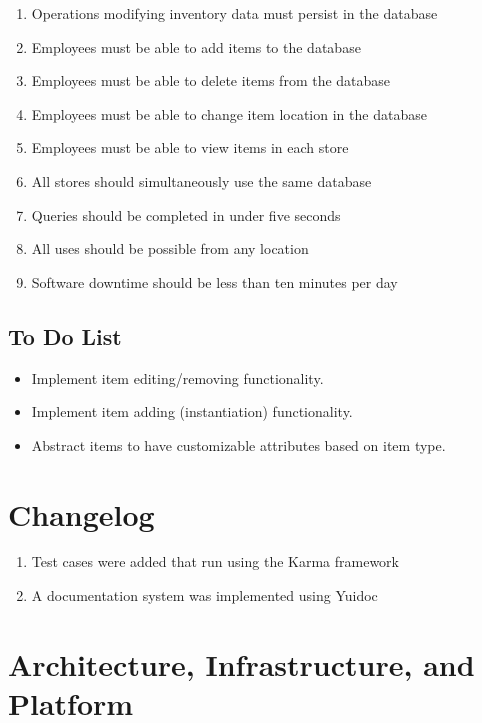 \documentclass[letterpaper, 12pt]{article}
\begin{document}
\begin{enumerate}
\item Operations modifying inventory data must persist in the database
\item Employees must be able to add items to the database
\item Employees must be able to delete items from the database
\item Employees must be able to change item location in the database
\item Employees must be able to view items in each store
\item All stores should simultaneously use the same database
\item Queries should be completed in under five seconds
\item All uses should be possible from any location
\item Software downtime should be less than ten minutes per day
\end{enumerate}

\subsection{To Do List}
\begin{itemize}
\item Implement item editing/removing functionality.
\item Implement item adding (instantiation) functionality.
\item Abstract items to have customizable attributes based on item type.
\end{itemize}


%
%


\section{Changelog}
\begin{enumerate}
\item Test cases were added that run using the Karma framework
\item A documentation system was implemented using Yuidoc
\end{enumerate}

\section{Architecture, Infrastructure, and Platform}
\end{document}
